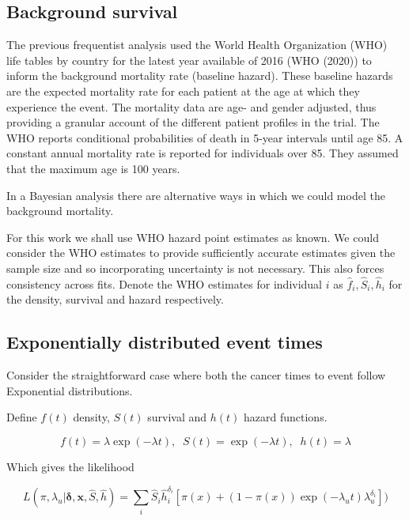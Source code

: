 \documentclass[
]{article}
\begin{document}
\hypertarget{background-survival}{%
\subsection{Background survival}\label{background-survival}}

The previous frequentist analysis used the World Health Organization
(WHO) life tables by country for the latest year available of 2016 (WHO
(2020)) to inform the background mortality rate (baseline hazard). These
baseline hazards are the expected mortality rate for each patient at the
age at which they experience the event. The mortality data are age- and
gender adjusted, thus providing a granular account of the different
patient profiles in the trial. The WHO reports conditional probabilities
of death in 5-year intervals until age 85. A constant annual mortality
rate is reported for individuals over 85. They assumed that the maximum
age is 100 years.

In a Bayesian analysis there are alternative ways in which we could
model the background mortality.

For this work we shall use WHO hazard point estimates as known. We could
consider the WHO estimates to provide sufficiently accurate estimates
given the sample size and so incorporating uncertainty is not necessary.
This also forces consistency across fits. Denote the WHO estimates for
individual \(i\) as \(\hat{f}_i, \hat{S}_i, \hat{h}_i\) for the density,
survival and hazard respectively.

\hypertarget{exponentially-distributed-event-times}{%
\subsection{Exponentially distributed event
times}\label{exponentially-distributed-event-times}}

Consider the straightforward case where both the cancer times to event
follow Exponential distributions.

Define \(f(t)\) density, \(S(t)\) survival and \(h(t)\) hazard
functions.

\[
f(t) = \lambda \exp(-\lambda t), \;\; S(t) = \exp(-\lambda t), \;\; h(t) = \lambda
\]

Which gives the likelihood

\[
L(\pi, \lambda_u | \boldsymbol{\delta}, \boldsymbol{x}, \hat{S}, \hat{h}) =
 \sum_i \hat{S}_i \hat{h}_i^{\delta_i}[\pi(x) +
   (1 − \pi(x)) \exp(-\lambda_u t) \lambda_u^{\delta_i}])
\]
\end{document}
